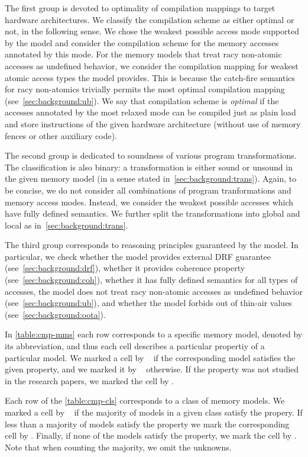 The first group is devoted to optimality of compilation mappings
to target hardware architectures. We 
classify the compilation scheme as either optimal or not,
in the following sense.
We chose the weakest possible access mode supported by the model
and consider the compilation scheme for the memory accesses annotated by this mode. 
For the memory models that treat racy non-atomic accesses
as undefined behavior, we consider the compilation mapping
for weakest atomic access types the model provides.
This is because the catch-fire semantics for racy non-atomics 
trivially permits the most optimal compilation mapping (see~\cref{sec:background:ub}).
We say that compilation scheme is \emph{optimal} if the 
accesses annotated by the most relaxed mode 
can be compiled just as plain load and store instructions 
of the given hardware architecture 
(\ie without use of memory fences or other auxiliary code). 

The second group is dedicated to soundness of various program transformations. 
The classification is also binary: a transformation is either sound or unsound 
in the given memory model (in a sense stated in~\cref{sec:background:trans}).
Again, to be concise, we do not consider all combinations 
of program tranformations and memory access modes. 
Instead, we consider the weakest possible accesses which have fully defined semantics. 
We further split the transformations into global and local as in~\cref{sec:background:trans}.

The third group corresponds to reasoning 
principles guaranteed by the model. In particular, we check 
whether the model provides external DRF guarantee (see~\cref{sec:background:drf}), 
whether it provides coherence property (see~\cref{sec:background:coh}),
whether it has fully defined semantics for all types of accesses, 
\ie the model does not treat racy non-atomic accesses as undefined behavior (see~\cref{sec:background:ub}),
and whether the model forbids out of thin-air values (see~\cref{sec:background:oota}).

In \cref{table:cmp-mms} each row corresponds to 
a specific memory model, denoted by its abbreviation, 
and thus each cell describes a particular propertiy of a particular model. 
We marked a cell by \cmark~ if the corresponding model satisfies the given property,
and we marked it by \xmark~ otherwise.
If the property was not studied in the research papers, we marked the cell by \qmark.

Each row of the \cref{table:cmp-cls} corresponds to a class of memory models.
We marked a cell by \cmark~ if the majority of models in a given class satisfy the propery. 
If less than a majority of models satisfy the property we mark 
the corresponding cell by \wmark.
Finally, if none of the models satisfy the property, we mark the cell by \xmark. 
Note that when counting the majority, we omit the unknowns.  

